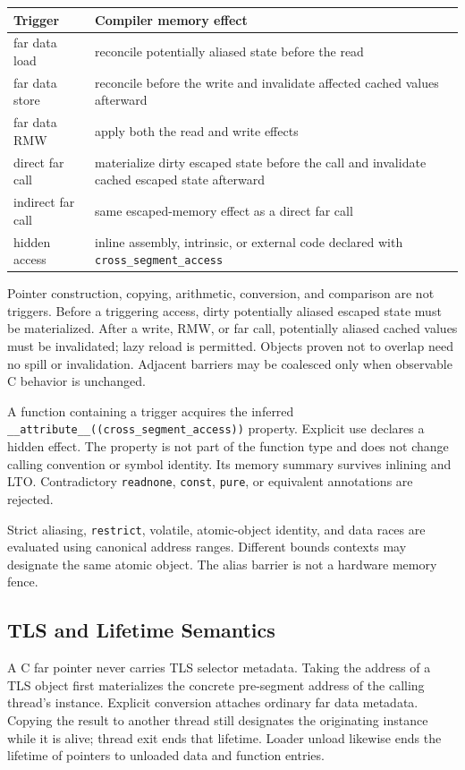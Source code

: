 \documentclass[10pt,twoside]{article}
\begin{document}
\Needspace{2.0in}
\begingroup\footnotesize
\setlength{\tabcolsep}{2pt}
\begin{longtable}{@{}p{1.55in}p{4.0in}@{}}
\toprule
\textbf{Trigger} & \textbf{Compiler memory effect}\\
\midrule
\endhead
far data load & reconcile potentially aliased state before the read\\
far data store & reconcile before the write and invalidate affected cached values afterward\\
far data RMW & apply both the read and write effects\\
direct far call & materialize dirty escaped state before the call and invalidate cached escaped state afterward\\
indirect far call & same escaped-memory effect as a direct far call\\
hidden access & inline assembly, intrinsic, or external code declared with \texttt{cross\_segment\_access}\\
\bottomrule
\end{longtable}
\endgroup

Pointer construction, copying, arithmetic, conversion, and comparison are not
triggers. Before a triggering access, dirty potentially aliased escaped state
must be materialized. After a write, RMW, or far call, potentially aliased
cached values must be invalidated; lazy reload is permitted. Objects proven
not to overlap need no spill or invalidation. Adjacent barriers may be
coalesced only when observable C behavior is unchanged.

A function containing a trigger acquires the inferred
\texttt{\_\_attribute\_\_((cross\_segment\_access))} property. Explicit use
declares a hidden effect. The property is not part of the function type and
does not change calling convention or symbol identity. Its memory summary
survives inlining and LTO. Contradictory \texttt{readnone}, \texttt{const},
\texttt{pure}, or equivalent annotations are rejected.

Strict aliasing, \texttt{restrict}, volatile, atomic-object identity, and data
races are evaluated using canonical address ranges. Different bounds contexts
may designate the same atomic object. The alias barrier is not a hardware
memory fence.

\subsection{TLS and Lifetime Semantics}
A C far pointer never carries TLS selector metadata. Taking the address of a
TLS object first materializes the concrete pre-segment address of the calling
thread's instance. Explicit conversion attaches ordinary far data metadata.
Copying the result to another thread still designates the originating instance
while it is alive; thread exit ends that lifetime. Loader unload likewise ends
the lifetime of pointers to unloaded data and function entries.
\end{document}
